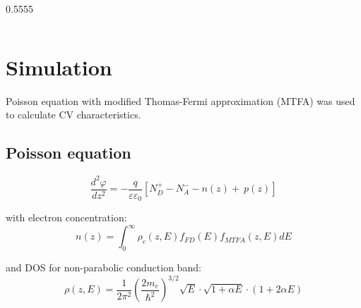 \documentclass[final, xcolor=cmyk]{beamer}
\newcommand{\figfont}{\normalsize} %
\begin{document}
\begin{poster}
\vspace{3ex}
\begin{columns}
    \figfont
    \newcommand{\figwidth}{0.5555\columnwidth}
    \begin{column}{\figwidth}
    \end{column}
    \begin{column}{\columnwidth-\figwidth}
        
    \end{column}
\end{columns}
\vspace{-2ex}

\section{Simulation} \justifying

Poisson equation with modified Thomas-Fermi approximation (MTFA) was used to calculate CV characteristics.
\vspace*{-1ex}

\subsection{Poisson equation}
\vspace*{-1ex}
    $$
        \frac{d^2\varphi}{dz^2} =
         -\frac{q}{\varepsilon\varepsilon_0}\left[N_D^+ - N_A^- - n(z) + \
          p(z)\right] 
    $$
    
    with electron concentration:
    $$
        n(z) = \int_{0}^{\infty}\rho_c(z,E) f_{FD}(E) f_{MTFA}(z,E)dE
    $$ 
    
    and  DOS for non-parabolic conduction band:  
    $$
        \rho \left(z,E\right) = \frac{1}{2\pi^2} \left(\frac{2m_{e}}{\hbar^2}\right)^{3/2} \!\!\! \sqrt{E} \cdot \sqrt{1+\alpha E} \cdot \left(1+ 2\alpha E \right)
    $$  
    


\end{poster}
\end{document}
